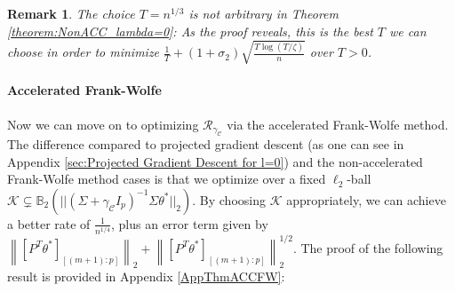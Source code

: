 \documentclass{article}
\newtheorem{remark}{\textbf{Remark}}
\begin{document}
\begin{remark}
The choice $T = n^{1/3}$ is not arbitrary in Theorem \ref{theorem:NonACC_lambda=0}: As the proof reveals, this is the best $T$ we can choose in order to minimize $\frac{1}{T} + (1 + \sigma_2)\sqrt{\frac{T\log(T/\zeta)}{n}}$ over $T > 0$.

\end{remark}


\paragraph{Accelerated Frank-Wolfe}

Now we can move on to optimizing $\mathcal{R}_{\gamma_{\mathcal{C}}}$ via the accelerated Frank-Wolfe method. The difference compared to projected gradient descent (as one can see in Appendix \ref{sec:Projected Gradient Descent for l=0}) and the non-accelerated Frank-Wolfe method cases is that we optimize over a fixed $\ell_2$-ball $\mathcal{K} \subsetneq \mathbb{B}_{2}\left(||(\Sigma + \gamma_{\mathcal{C}}I_p)^{-1}\Sigma\theta^*||_2\right)$. By choosing $\mathcal{K}$ appropriately, we can achieve a better rate of $\frac{1}{n^{1/4}}$, plus an error term given by $\left\|[P^T\theta^*]_{[(m + 1):p]}\right\|_2 + \left\|[P^T\theta^*]_{[(m + 1):p]}\right\|_2^{1/2}$.
The proof of the following result is provided in Appendix \ref{AppThmACCFW}:
\end{document}

